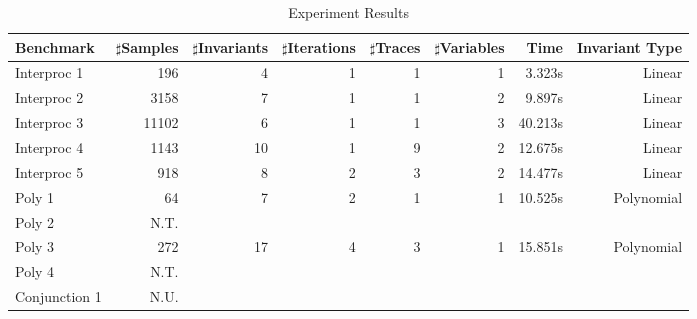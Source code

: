 \begin{table*}[t]
    \begin{center}
    \begin{center}
    \begin{adjustbox}{max width=1.0\textwidth}
    \begin{tabular}{l | r | r | r | r | r | r | r}
        \hline\hline
        Benchmark 
            & $\sharp$Samples & $\sharp$Invariants & $\sharp$Iterations 
            & $\sharp$Traces & $\sharp$Variables
            & Time & Invariant Type \\
        \hline
        Interproc 1
            & 196 & 4 & 1 
            & 1 & 1
            & 3.323s & Linear \\
        \hline
        Interproc 2
            & 3158 & 7 & 1 
            & 1 & 2
            & 9.897s & Linear \\
        \hline
        Interproc 3
            & 11102 & 6 & 1
            & 1 & 3
            & 40.213s & Linear \\
        \hline
        Interproc 4
            & 1143 & 10 & 1
            & 9 & 2
            & 12.675s & Linear \\
        \hline
        Interproc 5
            & 918 & 8 & 2 
            & 3 & 2
            & 14.477s & Linear \\
        \hline
        Poly 1
            & 64 & 7 & 2
            & 1 & 1 
            & 10.525s & Polynomial \\
        \hline
        Poly 2 
            & N.T. \\
        \hline
        Poly 3 
            & 272 & 17 & 4 
            & 3 & 1 
            & 15.851s & Polynomial \\
        \hline
        Poly 4 
            & N.T. \\
        \hline
        Conjunction 1
            & N.U. \\
        \hline
    \end{tabular}
    \end{adjustbox}
    \end{center}
    \end{center}
    \caption{Experiment Results}
    \label{tab:experiments}
\end{table*}



